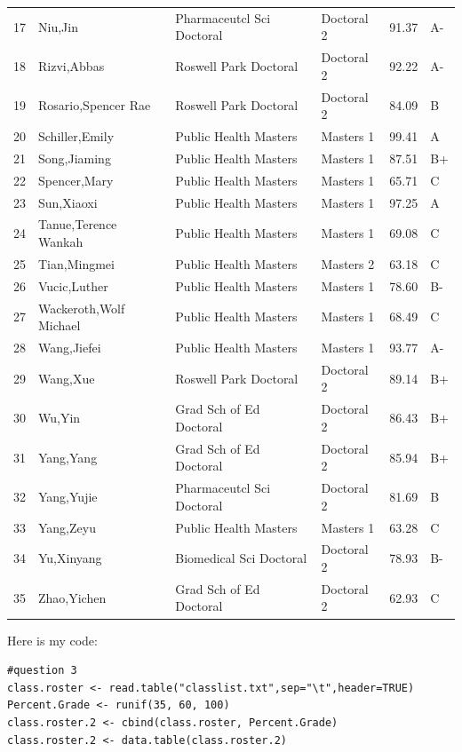 \documentclass[letterpaper]{article}
\begin{document}
\begin{enumerate}
\begin{table}[ht]
\begin{tabular}{rlllrl}
  17 & Niu,Jin & Pharmaceutcl Sci Doctoral  & Doctoral 2 & 91.37 & A- \\ 
  18 & Rizvi,Abbas & Roswell Park Doctoral  & Doctoral 2 & 92.22 & A- \\ 
  19 & Rosario,Spencer Rae & Roswell Park Doctoral  & Doctoral 2 & 84.09 & B \\ 
  20 & Schiller,Emily & Public Health Masters  & Masters 1 & 99.41 & A \\ 
  21 & Song,Jiaming & Public Health Masters  & Masters 1 & 87.51 & B+ \\ 
  22 & Spencer,Mary & Public Health Masters  & Masters 1 & 65.71 & C \\ 
  23 & Sun,Xiaoxi & Public Health Masters  & Masters 1 & 97.25 & A \\ 
  24 & Tanue,Terence Wankah & Public Health Masters  & Masters 1 & 69.08 & C \\ 
  25 & Tian,Mingmei & Public Health Masters  & Masters 2 & 63.18 & C \\ 
  26 & Vucic,Luther & Public Health Masters  & Masters 1 & 78.60 & B- \\ 
  27 & Wackeroth,Wolf Michael & Public Health Masters  & Masters 1 & 68.49 & C \\ 
  28 & Wang,Jiefei & Public Health Masters  & Masters 1 & 93.77 & A- \\ 
  29 & Wang,Xue & Roswell Park Doctoral  & Doctoral 2 & 89.14 & B+ \\ 
  30 & Wu,Yin & Grad Sch of Ed Doctoral  & Doctoral 2 & 86.43 & B+ \\ 
  31 & Yang,Yang & Grad Sch of Ed Doctoral  & Doctoral 2 & 85.94 & B+ \\ 
  32 & Yang,Yujie & Pharmaceutcl Sci Doctoral  & Doctoral 2 & 81.69 & B \\ 
  33 & Yang,Zeyu & Public Health Masters  & Masters 1 & 63.28 & C \\ 
  34 & Yu,Xinyang & Biomedical Sci Doctoral  & Doctoral 2 & 78.93 & B- \\ 
  35 & Zhao,Yichen & Grad Sch of Ed Doctoral  & Doctoral 2 & 62.93 & C \\ 
   \hline
\end{tabular}
\end{table}

Here is my code:
\begin{verbatim}
#question 3
class.roster <- read.table("classlist.txt",sep="\t",header=TRUE)
Percent.Grade <- runif(35, 60, 100)
class.roster.2 <- cbind(class.roster, Percent.Grade)
class.roster.2 <- data.table(class.roster.2)


\end{verbatim}
\end{enumerate}
\end{document}
